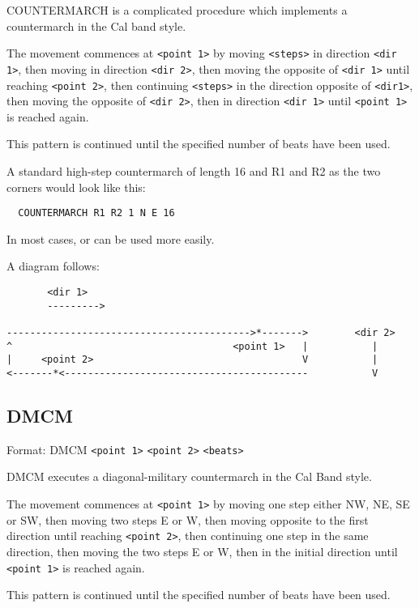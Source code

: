 COUNTERMARCH is a complicated procedure which implements a countermarch in
the Cal band style.

The movement commences at \verb$<point 1>$ by moving \verb$<steps>$ in
direction \verb$<dir 1>$, then moving in direction \verb$<dir 2>$, then
moving the opposite of \verb$<dir 1>$ until reaching \verb$<point 2>$,
then continuing \verb$<steps>$ in the direction opposite of \verb$<dir1>$,
then moving the opposite of \verb$<dir 2>$, then in direction \verb$<dir 1>$
until \verb$<point 1>$ is reached again.

This pattern is continued until the specified number of beats have been used.

A standard high-step countermarch of length 16 and R1 and R2 as the two
corners would look like this:
\begin{verbatim}
  COUNTERMARCH R1 R2 1 N E 16
\end{verbatim}

In most cases,  or  can be used
more easily.

A diagram follows:
                                         
\begin{verbatim}
       <dir 1>
       --------->

------------------------------------------>*------->        <dir 2>
^                                      <point 1>   |           |
|     <point 2>                                    V           |
<-------*<------------------------------------------           V
\end{verbatim}

\subsection{DMCM}\label{dmcm}

Format: DMCM \verb$<point 1>$ \verb$<point 2>$ \verb$<beats>$

DMCM executes a diagonal-military countermarch in the Cal Band style.

The movement commences at \verb$<point 1>$ by moving one step either NW, NE,
SE or SW, then moving two steps E or W, then moving opposite to the first
direction until reaching \verb$<point 2>$, then continuing one step in the
same direction, then moving the two steps E or W, then in the initial
direction until \verb$<point 1>$ is reached again.

This pattern is continued until the specified number of beats have been used.

